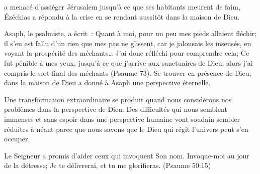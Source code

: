




 a menacé d'assiéger
 Jérusalem jusqu'à ce que ses habitants meurent de faim,
 Ézéchias a répondu à la crise en se rendant aussitôt
 dans la maison de Dieu. 


Asaph, le psalmiste, a écrit~: 
 \og Quant à moi, pour un peu mes pieds allaient fléchir;
 il s’en est fallu d’un rien que mes pas ne glissent,
 car je jalousais les insensés, en voyant la prospérité des méchants\dots{}
 J’ai donc réfléchi pour comprendre cela; Ce fut pénible à mes yeux,
 jusqu’à ce que j’arrive aux sanctuaires de Dieu;
 alors j’ai compris le sort final des méchants \fg{} (Psaume 73).
 Se trouver en présence de Dieu, dans la maison de Dieu
 a donné à Asaph une perspective éternelle. 

Une transformation extraordinaire se produit quand nous considérons
 nos problèmes dans la perspective de Dieu.
 Des difficultés qui nous semblent immenses et sans espoir
 dans une perspective humaine vont soudain sembler réduites à néant
 \ocadr parce que nous savons que le Dieu qui régit l'univers
 peut s'en occuper. 

Le Seigneur a promis d'aider ceux qui invoquent Son nom.
 \og Invoque-moi au jour de la détresse; Je te délivrerai,
 et tu me glorifieras. \fg{} (Psaume 50:15) 

\dvrule







